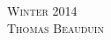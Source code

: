 \documentclass[landscape,a4paper]{article}
\begin{document}
\pagestyle{empty} %

\noindent



\begin{center}
\textsc{\LARGE Winter 2014}\\ %
\textsc{\large Thomas Beauduin} %
\end{center}

\end{document}
